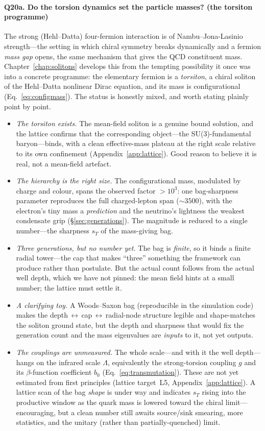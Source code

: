 \paragraph{Q20a. Do the torsion dynamics set the particle masses? (the torsiton programme)}
The strong (Hehl--Datta) four-fermion interaction is of Nambu--Jona-Lasinio strength---the
setting in which chiral symmetry breaks dynamically and a fermion \emph{mass gap} opens, the
same mechanism that gives the QCD constituent mass. Chapter~\ref{chap:solitons} develops this
from the tempting possibility it once was into a concrete programme: the elementary fermion is a
\emph{torsiton}, a chiral soliton of the Hehl--Datta nonlinear Dirac equation, and its mass is
configurational (Eq.~\ref{eq:configmass}). The status is honestly mixed, and worth stating plainly
point by point.
\begin{itemize}
  \item \emph{The torsiton exists.} The mean-field soliton is a genuine bound solution, and the
  lattice confirms that the corresponding object---the SU(3)-fundamental baryon---binds, with a
  clean effective-mass plateau at the right scale relative to its own confinement
  (Appendix~\ref{app:lattice}). Good reason to believe it is real, not a mean-field artefact.
  \item \emph{The hierarchy is the right size.} The configurational mass, modulated by charge and
  colour, spans the observed factor $>10^{3}$: one bag-sharpness parameter reproduces the full
  charged-lepton span ($\sim\!3500$), with the electron's tiny mass a \emph{prediction} and the
  neutrino's lightness the weakest condensate grip (\S\ref{sec:generations}). The magnitude is
  reduced to a single number---the sharpness $s_T$ of the mass-giving bag.
  \item \emph{Three generations, but no number yet.} The bag is \emph{finite}, so it binds a finite
  radial tower---the cap that makes ``three'' something the framework can produce rather than
  postulate. But the actual count follows from the actual well depth, which we have not pinned: the
  mean field hints at a small number; the lattice must settle it.
  \item \emph{A clarifying toy.} A Woods--Saxon bag (reproducible in the simulation code) makes the
  depth\,$\leftrightarrow$\,cap\,$\leftrightarrow$\,radial-node structure legible and shape-matches
  the soliton ground state, but the depth and sharpness that would fix the generation count and the
  mass eigenvalues are \emph{inputs} to it, not yet outputs.
  \item \emph{The couplings are unmeasured.} The whole scale---and with it the well depth---hangs on
  the infrared scale $\Lambda$, equivalently the strong-torsion coupling $g$ and its $\beta$-function
  coefficient $b_0$ (Eq.~\ref{eq:transmutation}). These are not yet estimated from first principles
  (lattice target~L5, Appendix~\ref{app:lattice}). A lattice scan of the bag \emph{shape} is under
  way and indicates $s_T$ rising into the productive window as the quark mass is lowered toward the
  chiral limit---encouraging, but a clean number still awaits source/sink smearing, more statistics,
  and the unitary (rather than partially-quenched) limit.
\end{itemize}
